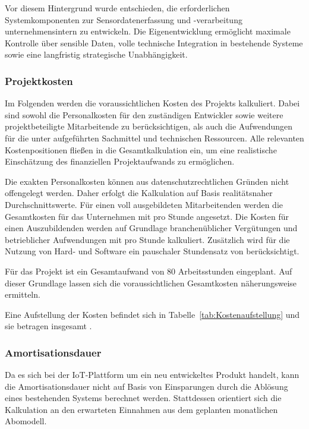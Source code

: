 		Vor diesem Hintergrund wurde entschieden,
		die erforderlichen Systemkomponenten zur Sensordatenerfassung und -verarbeitung unternehmensintern zu entwickeln.
		Die Eigenentwicklung ermöglicht maximale Kontrolle über sensible Daten,
		volle technische Integration in bestehende Systeme sowie eine langfristig strategische Unabhängigkeit.


	\subsubsection{Projektkosten}
	\label{sec:Projektkosten}
		Im Folgenden werden die voraussichtlichen Kosten des Projekts kalkuliert.
		Dabei sind sowohl die Personalkosten für den zuständigen Entwickler sowie weitere projektbeteiligte Mitarbeitende zu berücksichtigen,
		als auch die Aufwendungen für die unter  aufgeführten Sachmittel und technischen Ressourcen.
		Alle relevanten Kostenpositionen fließen in die Gesamtkalkulation ein,
		um eine realistische Einschätzung des finanziellen Projektaufwands zu ermöglichen.
		
		Die exakten Personalkosten können aus datenschutzrechtlichen Gründen nicht offengelegt werden.
		Daher erfolgt die Kalkulation auf Basis realitätsnaher Durchschnittswerte.
		Für einen voll ausgebildeten Mitarbeitenden werden die Gesamtkosten für das Unternehmen mit  pro Stunde angesetzt.
		Die Kosten für einen Auszubildenden werden auf Grundlage branchenüblicher Vergütungen
		und betrieblicher Aufwendungen mit  pro Stunde kalkuliert.
		Zusätzlich wird für die Nutzung von Hard- und Software ein pauschaler Stundensatz von  berücksichtigt.
		
		Für das Projekt ist ein Gesamtaufwand von 80 Arbeitsstunden eingeplant.
		Auf dieser Grundlage lassen sich die voraussichtlichen Gesamtkosten näherungsweise ermitteln.

		Eine Aufstellung der Kosten befindet sich in Tabelle~\ref{tab:Kostenaufstellung} und sie betragen insgesamt .


	\subsubsection{Amortisationsdauer}
	\label{sec:Amortisationsdauer}
		Da es sich bei der \ac{IoT}-Plattform um ein neu entwickeltes Produkt handelt,
		kann die Amortisationsdauer nicht auf Basis von Einsparungen durch die Ablösung eines bestehenden Systems berechnet werden.
		Stattdessen orientiert sich die Kalkulation an den erwarteten Einnahmen aus dem geplanten monatlichen Abomodell.

